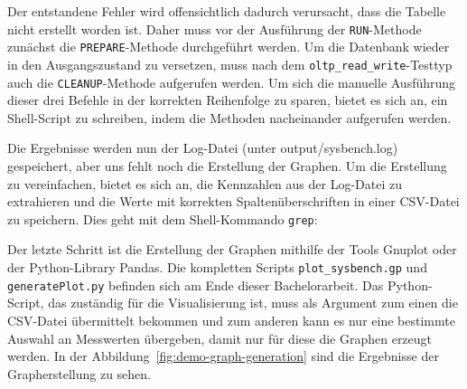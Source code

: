 Der entstandene Fehler wird offensichtlich dadurch verursacht, dass die Tabelle nicht erstellt worden ist.
Daher muss vor der Ausführung der \texttt{RUN}-Methode zunächst die \texttt{PREPARE}-Methode durchgeführt werden.
Um die Datenbank wieder in den Ausgangszustand zu versetzen, muss nach dem \texttt{oltp\_read\_write}-Testtyp auch die \texttt{CLEANUP}-Methode aufgerufen werden.
Um sich die manuelle Ausführung dieser drei Befehle in der korrekten Reihenfolge zu sparen, bietet es sich an, ein Shell-Script zu schreiben, indem die Methoden nacheinander aufgerufen werden.

\vspace{-5pt}

\vspace{-5pt}

Die Ergebnisse werden nun der Log-Datei (unter output/sysbench.log) gespeichert, aber uns fehlt noch die Erstellung der Graphen.
Um die Erstellung zu vereinfachen, bietet es sich an, die Kennzahlen aus der Log-Datei zu extrahieren und die Werte mit korrekten Spaltenüberschriften in einer CSV-Datei zu speichern.
Dies geht mit dem Shell-Kommando \texttt{grep}:

\vspace{-5pt}

\vspace{-5pt}

Der letzte Schritt ist die Erstellung der Graphen mithilfe der Tools Gnuplot oder der Python-Library Pandas.
Die kompletten Scripts \texttt{plot\_sysbench.gp} und \texttt{generatePlot.py} befinden sich am Ende dieser Bachelorarbeit.
Das Python-Script, das zuständig für die Visualisierung ist, muss als Argument zum einen die CSV-Datei übermittelt bekommen und zum anderen kann es nur eine bestimmte Auswahl an Messwerten übergeben, damit nur für diese die Graphen erzeugt werden.
In der Abbildung~\ref{fig:demo-graph-generation} sind die Ergebnisse der Grapherstellung zu sehen.

\vspace{-5pt}

\vspace{-5pt}

